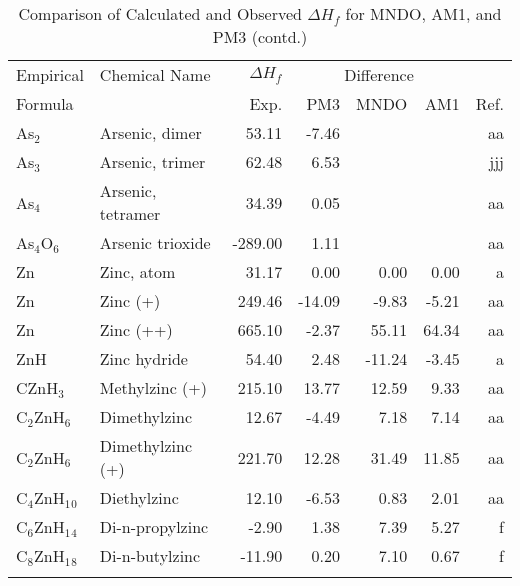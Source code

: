 \begin{table}
\caption{Comparison of Calculated and Observed $\Delta H_f$ 
for MNDO, AM1, and PM3 (contd.)}
\begin{center}
\compresstable
\begin{tabular}{llrrrrr}
Empirical & Chemical Name & $\Delta H_f$ & \multicolumn{3}{c}{Difference} & \\
Formula   &               & Exp. & PM3 &  MNDO  &  AM1 &     Ref.\\
\hline
 As$_2$         & Arsenic, dimer                         &    53.11    &    -7.46  &  &  &     aa\\
 As$_3$         & Arsenic, trimer                        &    62.48    &     6.53  &  &  &    jjj\\
 As$_4$         & Arsenic, tetramer                      &    34.39    &     0.05  &  &  &     aa\\
 As$_4$O$_6$       & Arsenic trioxide                       &  -289.00    &     1.11  &  &  &     aa\\
 Zn          & Zinc, atom                             &    31.17    &     0.00  &     0.00  &     0.00  &      a\\
 Zn          & Zinc (+)                               &   249.46    &   -14.09  &    -9.83  &    -5.21  &     aa\\
 Zn          & Zinc (++)                              &   665.10    &    -2.37  &    55.11  &    64.34  &     aa\\
 ZnH         & Zinc hydride                           &    54.40    &     2.48  &   -11.24  &    -3.45  &      a\\
 CZnH$_3$       & Methylzinc (+)                         &   215.10    &    13.77  &    12.59  &     9.33  &     aa\\
 C$_2$ZnH$_6$      & Dimethylzinc                           &    12.67    &    -4.49  &     7.18  &     7.14  &     aa\\
 C$_2$ZnH$_6$      & Dimethylzinc (+)                       &   221.70    &    12.28  &    31.49  &    11.85  &     aa\\
 C$_4$ZnH$_1$$_0$     & Diethylzinc                            &    12.10    &    -6.53  &     0.83  &     2.01  &     aa\\
 C$_6$ZnH$_1$$_4$     & Di-n-propylzinc                        &    -2.90    &     1.38  &     7.39  &     5.27  &      f\\
 C$_8$ZnH$_1$$_8$     & Di-n-butylzinc                         &   -11.90    &     0.20  &     7.10  &     0.67  &      f\\
$$
\end{tabular}
\end{center}
\end{table}
